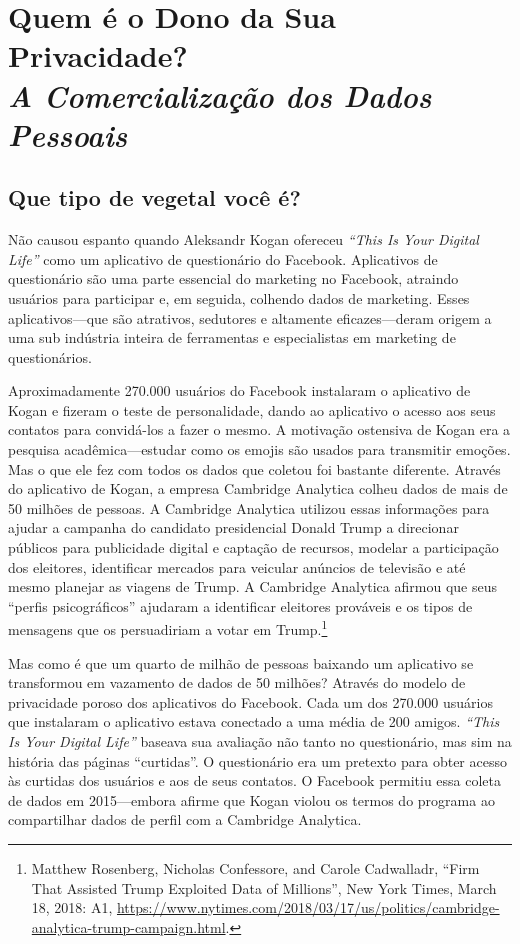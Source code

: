 \documentclass{book}
\newcommand{\ingles}[1]{\textit{#1}}
\begin{document}
\chapter[Quem é o Dono da Sua Privacidade?]{Quem é o Dono da Sua Privacidade?\\\large\textit{A Comercialização dos Dados Pessoais}}
\label{quem}

\section{Que tipo de vegetal você é?}
\label{quem:vegetal}
Não causou espanto quando Aleksandr Kogan ofereceu \ingles{``This Is Your Digital Life''}
como um aplicativo de questionário do Facebook. Aplicativos de questionário são
uma parte essencial do marketing no Facebook, atraindo usuários para participar
e, em seguida, colhendo dados de marketing. Esses aplicativos---que são atrativos,
sedutores e altamente eficazes---deram origem a uma sub indústria inteira de
ferramentas e especialistas em marketing de questionários.

Aproximadamente 270.000 usuários do Facebook instalaram o aplicativo de Kogan
e fizeram o teste de personalidade, dando ao aplicativo o acesso aos seus contatos
para convidá-los a fazer o mesmo. A motivação ostensiva de Kogan era a pesquisa
acadêmica---estudar como os emojis são usados para transmitir emoções. Mas o que
ele fez com todos os dados que coletou foi bastante diferente. Através do
aplicativo de Kogan, a empresa Cambridge Analytica colheu dados de mais de 50
milhões de pessoas. A Cambridge Analytica utilizou essas informações para ajudar
a campanha do candidato presidencial Donald Trump a direcionar públicos para    
publicidade digital e captação de recursos, modelar a participação dos eleitores,
identificar mercados para veicular anúncios de televisão e até mesmo planejar as
viagens de Trump. A Cambridge Analytica afirmou que seus ``perfis psicográficos''
ajudaram a identificar eleitores prováveis e os tipos de mensagens que os
persuadiriam a votar em Trump.\footnote{Matthew Rosenberg, Nicholas Confessore,
and Carole Cadwalladr, ``Firm That Assisted Trump Exploited Data of Millions'',
New York Times, March 18, 2018: A1,
\url{https://www.nytimes.com/2018/03/17/us/politics/cambridge-analytica-trump-campaign.html}.}

Mas como é que um quarto de milhão de pessoas baixando um aplicativo se transformou
em vazamento de dados de 50 milhões? Através do modelo de privacidade poroso dos
aplicativos do Facebook. Cada um dos 270.000 usuários que instalaram o aplicativo
estava conectado a uma média de 200 amigos. \ingles{``This Is Your Digital Life''}
baseava sua avaliação não tanto no questionário, mas sim na história das páginas
``curtidas''. O questionário era um pretexto para obter acesso às curtidas dos
usuários e aos de seus contatos. O Facebook permitiu essa coleta de dados em 
2015---embora afirme que Kogan violou os termos do programa ao compartilhar dados
de perfil com a Cambridge Analytica.
\end{document}
